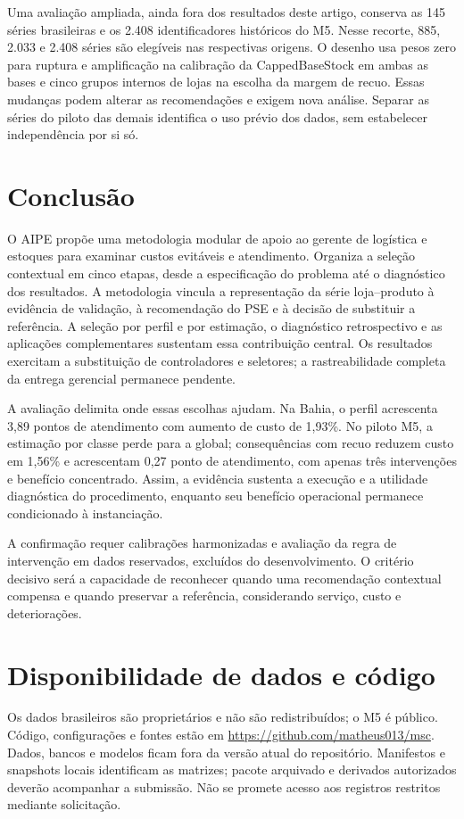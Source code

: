 \documentclass[preprint,12pt]{elsarticle}
\begin{document}
Uma avaliação ampliada, ainda fora dos resultados deste artigo, conserva as 145 séries brasileiras e os 2.408 identificadores históricos do M5. Nesse recorte, 885, 2.033 e 2.408 séries são elegíveis nas respectivas origens. O desenho usa pesos zero para ruptura e amplificação na calibração da CappedBaseStock em ambas as bases e cinco grupos internos de lojas na escolha da margem de recuo. Essas mudanças podem alterar as recomendações e exigem nova análise. Separar as séries do piloto das demais identifica o uso prévio dos dados, sem estabelecer independência por si só.

\section{Conclusão}
O AIPE propõe uma metodologia modular de apoio ao gerente de logística e estoques para examinar custos evitáveis e atendimento. Organiza a seleção contextual em cinco etapas, desde a especificação do problema até o diagnóstico dos resultados. A metodologia vincula a representação da série loja--produto à evidência de validação, à recomendação do PSE e à decisão de substituir a referência. A seleção por perfil e por estimação, o diagnóstico retrospectivo e as aplicações complementares sustentam essa contribuição central. Os resultados exercitam a substituição de controladores e seletores; a rastreabilidade completa da entrega gerencial permanece pendente.

A avaliação delimita onde essas escolhas ajudam. Na Bahia, o perfil acrescenta 3,89 pontos de atendimento com aumento de custo de 1,93\%. No piloto M5, a estimação por classe perde para a global; consequências com recuo reduzem custo em 1,56\% e acrescentam 0,27 ponto de atendimento, com apenas três intervenções e benefício concentrado. Assim, a evidência sustenta a execução e a utilidade diagnóstica do procedimento, enquanto seu benefício operacional permanece condicionado à instanciação.

A confirmação requer calibrações harmonizadas e avaliação da regra de intervenção em dados reservados, excluídos do desenvolvimento. O critério decisivo será a capacidade de reconhecer quando uma recomendação contextual compensa e quando preservar a referência, considerando serviço, custo e deteriorações.

\section*{Disponibilidade de dados e código}
Os dados brasileiros são proprietários e não são redistribuídos; o M5 é público. Código, configurações e fontes estão em \url{https://github.com/matheus013/msc}. Dados, bancos e modelos ficam fora da versão atual do repositório. Manifestos e snapshots locais identificam as matrizes; pacote arquivado e derivados autorizados deverão acompanhar a submissão. Não se promete acesso aos registros restritos mediante solicitação.
\end{document}
